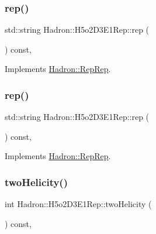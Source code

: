 \subsubsection{\texorpdfstring{rep()}{rep()}\hspace{0.1cm}{\footnotesize\ttfamily [4/5]}}
{\footnotesize\ttfamily std\+::string Hadron\+::\+H5o2\+D3\+E1\+Rep\+::rep (\begin{DoxyParamCaption}{ }\end{DoxyParamCaption}) const\hspace{0.3cm}{\ttfamily [inline]}, {\ttfamily [virtual]}}



Implements \mbox{\hyperlink{structHadron_1_1RepRep_ab3213025f6de249f7095892109575fde}{Hadron\+::\+Rep\+Rep}}.

\mbox{\label{structHadron_1_1H5o2D3E1Rep_a08df80842b4ad843fc04e24eb3febd57}} 
\subsubsection{\texorpdfstring{rep()}{rep()}\hspace{0.1cm}{\footnotesize\ttfamily [5/5]}}
{\footnotesize\ttfamily std\+::string Hadron\+::\+H5o2\+D3\+E1\+Rep\+::rep (\begin{DoxyParamCaption}{ }\end{DoxyParamCaption}) const\hspace{0.3cm}{\ttfamily [inline]}, {\ttfamily [virtual]}}



Implements \mbox{\hyperlink{structHadron_1_1RepRep_ab3213025f6de249f7095892109575fde}{Hadron\+::\+Rep\+Rep}}.

\mbox{\label{structHadron_1_1H5o2D3E1Rep_a27a2e169bad892e46433717d73c2a9ed}} 
\subsubsection{\texorpdfstring{twoHelicity()}{twoHelicity()}\hspace{0.1cm}{\footnotesize\ttfamily [1/3]}}
{\footnotesize\ttfamily int Hadron\+::\+H5o2\+D3\+E1\+Rep\+::two\+Helicity (\begin{DoxyParamCaption}{ }\end{DoxyParamCaption}) const\hspace{0.3cm}{\ttfamily [inline]}, {\ttfamily [virtual]}}

